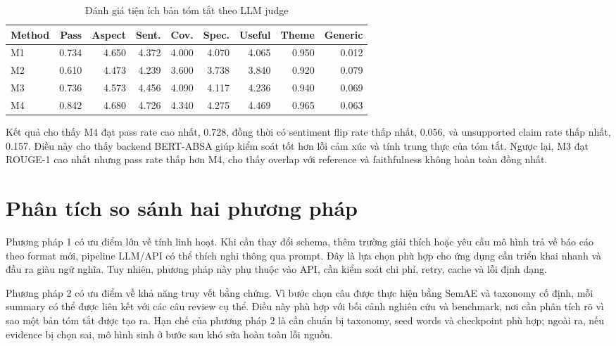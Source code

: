 \begin{table}[H]
\centering
\caption{Đánh giá tiện ích bản tóm tắt theo LLM judge}
\label{tab:summary-utility}
\small
\begin{tabular}{l r r r r r r r r}
\toprule
\textbf{Method} & \textbf{Pass} & \textbf{Aspect} & \textbf{Sent.} & \textbf{Cov.} & \textbf{Spec.} & \textbf{Useful} & \textbf{Theme} & \textbf{Generic} \\
\midrule
M1 & 0.734 & 4.650 & 4.372 & 4.000 & 4.070 & 4.065 & 0.950 & 0.012 \\
M2 & 0.610 & 4.473 & 4.239 & 3.600 & 3.738 & 3.840 & 0.920 & 0.079 \\
M3 & 0.736 & 4.573 & 4.456 & 4.090 & 4.117 & 4.236 & 0.940 & 0.069 \\
M4 & 0.842 & 4.680 & 4.726 & 4.340 & 4.275 & 4.469 & 0.965 & 0.063 \\
\bottomrule
\end{tabular}
\end{table}

Kết quả cho thấy M4 đạt pass rate cao nhất, 0.728, đồng thời có sentiment flip rate thấp nhất, 0.056, và unsupported claim rate thấp nhất, 0.157. Điều này cho thấy backend BERT-ABSA giúp kiểm soát tốt hơn lỗi cảm xúc và tính trung thực của tóm tắt. Ngược lại, M3 đạt ROUGE-1 cao nhất nhưng pass rate thấp hơn M4, cho thấy overlap với reference và faithfulness không hoàn toàn đồng nhất.

\section{Phân tích so sánh hai phương pháp}

Phương pháp 1 có ưu điểm lớn về tính linh hoạt. Khi cần thay đổi schema, thêm trường giải thích hoặc yêu cầu mô hình trả về báo cáo theo format mới, pipeline LLM/API có thể thích nghi thông qua prompt. Đây là lựa chọn phù hợp cho ứng dụng cần triển khai nhanh và đầu ra giàu ngữ nghĩa. Tuy nhiên, phương pháp này phụ thuộc vào API, cần kiểm soát chi phí, retry, cache và lỗi định dạng.

Phương pháp 2 có ưu điểm về khả năng truy vết bằng chứng. Vì bước chọn câu được thực hiện bằng SemAE và taxonomy cố định, mỗi summary có thể được liên kết với các câu review cụ thể. Điều này phù hợp với bối cảnh nghiên cứu và benchmark, nơi cần phân tích rõ vì sao một bản tóm tắt được tạo ra. Hạn chế của phương pháp 2 là cần chuẩn bị taxonomy, seed words và checkpoint phù hợp; ngoài ra, nếu evidence bị chọn sai, mô hình sinh ở bước sau khó sửa hoàn toàn lỗi nguồn.

